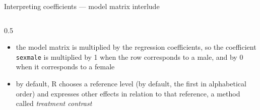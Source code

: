 \documentclass[
  10pt,
  ignorenonframetext,
  aspectratio=169,
  t]{beamer}
\newcommand{\blueit}[1]{\textcolor{bluebeamer}{\emph{#1}}}
\begin{document}
\begin{frame}[fragile]{Interpreting coefficients --- model matrix
interlude}
\begin{columns}[T]
\begin{column}{0.5\linewidth}
\begin{footnotesize}
\begin{itemize}
\item<2-> the model matrix is multiplied by the regression coefficients, so the coefficient \verb`sexmale` is multiplied by 1 when the row corresponds to a male, and by 0 when it corresponds to a female
\item<3-> by default, R chooses a reference level (by default, the first in alphabetical order) and expresses other effects in relation to that reference, a method called \blueit{treatment contrast}
\end{itemize}
\end{footnotesize}
\end{column}
\end{columns}
\end{frame}
\end{document}
